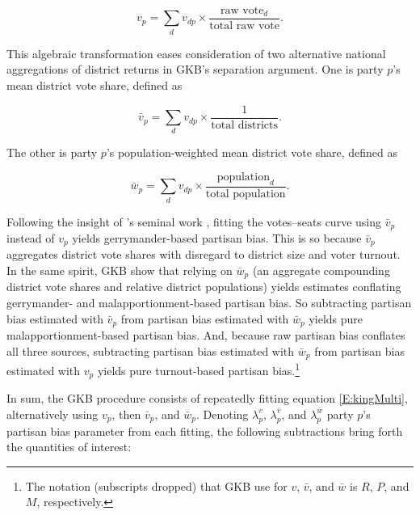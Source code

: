\documentclass[letter,12pt]{article}
\begin{document}
\begin{equation}
v_p  = \sum_d v_{dp} \times \frac{\text{raw vote}_d}{\text{total raw vote}}.  %
\end{equation}

\noindent This algebraic transformation eases consideration of two alternative national aggregations of district returns in GKB's separation argument. One is party $p$'s mean district vote share, defined as

\begin{equation}
\bar{v}_p  = \sum_d v_{dp} \times \frac{1}{\text{total districts}}. %
\end{equation}

\noindent The other is party $p$'s population-weighted mean district vote share, defined as

\begin{equation}
\bar{w}_p  = \sum_d v_{dp} \times \frac{\text{population}_d}{\text{total population}}. %
\end{equation}


Following the insight of \citeauthor{tufte1973seatsVotes}'s \citeyearpar{tufte1973seatsVotes} seminal work \citep[further elaborated in][]{gelman.king.1994EvalElSysRedis}, fitting the votes--seats curve using $\bar{v}_p$ instead of $v_p$ yields gerrymander-based partisan bias. This is so because $\bar{v}_p$ aggregates district vote shares with disregard to district size and voter turnout. In the same spirit, GKB show that relying on $\bar{w}_p$ (an aggregate compounding district vote shares and relative district populations) yields estimates conflating gerrymander- and malapportionment-based partisan bias. So subtracting partisan bias estimated with $\bar{v}_p$ from partisan bias estimated with $\bar{w}_p$ yields pure malapportionment-based partisan bias. And, because raw partisan bias conflates all three sources, subtracting partisan bias estimated with $\bar{w}_p$ from partisan bias estimated with $v_p$ yields pure turnout-based partisan bias.\footnote{The notation (subscripts dropped) that GKB use for $v$, $\bar{v}$, and $\bar{w}$ is $R$, $P$, and $M$, respectively.}  

In sum, the GKB procedure consists of repeatedly fitting equation \ref{E:kingMulti}, alternatively using $v_p$, then $\bar{v}_p$, and $\bar{w}_p$. Denoting $\lambda_p^v$, $\lambda_p^{\bar{v}}$, and $\lambda_p^{\bar{w}}$ party $p$'s partisan bias parameter from each fitting, the following subtractions bring forth the quantities of interest: 
\end{document}
